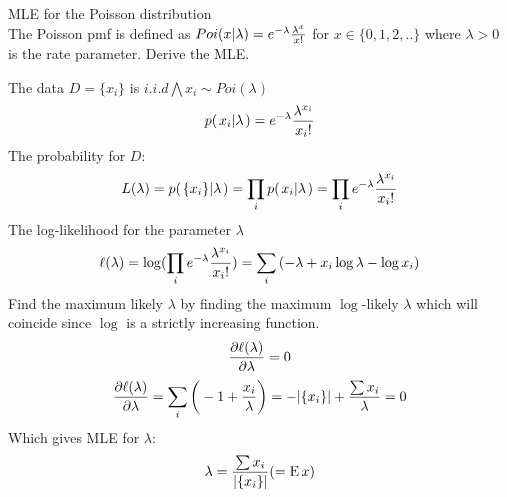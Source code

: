 \documentclass[a4paper,twoside=false,abstract=false,numbers=noenddot,
titlepage=false,headings=small,parskip=half,version=last]{scrartcl}
\begin{document}
\begin{exercise}{3.6} MLE for the Poisson distribution \\
    The Poisson pmf is defined as
    $Poi(x|\lambda)=e^{-{\lambda}}\frac{{\lambda}^{x}}{{x}!}$ for $x \in \{0,1,2,..\}$
    where $\lambda>0$ is the rate parameter. Derive the MLE. 
\end{exercise}
\begin{solution}
    The data $D = \{x_i\}$ is $i.i.d \bigwedge x_i\sim Poi(\lambda)$
    \begin{equation}
        p{(\left. x_i \middle\vert \lambda \right.)} = e^{-{\lambda}}\frac{{\lambda}^{x_i}}{{x_i}!}
    \end{equation}
    The probability for $D$:
    \begin{equation}
        L(\lambda)=p{(\left. \{x_i\} \middle\vert \lambda \right.)}=\prod\limits_i{p{(\left. x_i \middle\vert \lambda \right.)}}=\prod\limits_i e^{-{\lambda}}\frac{{\lambda}^{x_i}}{{x_i}!}
    \end{equation}
    The log-likelihood for the parameter $\lambda$
    \begin{equation}
        \ell(\lambda)=\log(\prod\limits_ie^{-{\lambda}}\frac{{\lambda}^{x_i}}{{x_i}!})=
        \sum\limits_i{(-\lambda+x_i \log\lambda-\log x_i)}
    \end{equation}
    Find the maximum likely $\lambda$ by finding the maximum $\log$-likely
    $\lambda$ which will coincide since $\log$ is a strictly increasing
    function.
    \begin{equation}
        \frac{\partial{\ell(\lambda)}}{\partial{\lambda}} = 0
    \end{equation}
    \begin{equation}
        \frac{\partial{\ell(\lambda)}}{\partial{\lambda}} =
        \sum\limits_i{\bigg(-1+\frac{x_i}{\lambda}\bigg)}=-|\{x_i\}|+\frac{\sum{x_i}}{\lambda}=0
    \end{equation}
    Which gives MLE for $\lambda$:
    \begin{equation}
        \lambda=\frac{\sum{x_i}}{|\{x_i\}|}(={\rm E}\, x)
    \end{equation}
\end{solution}
\end{document}
